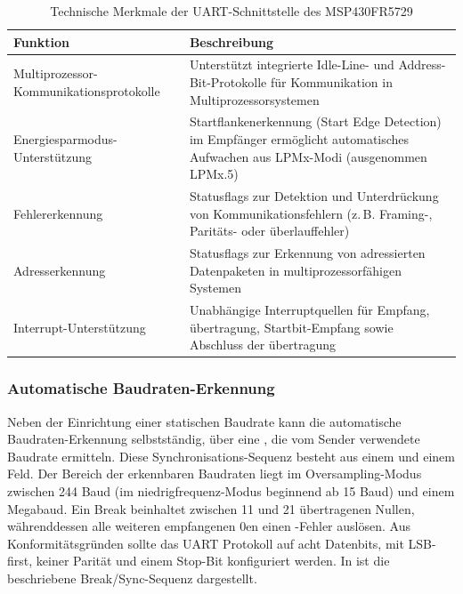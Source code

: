 \begin{table}[h!]
	\small
	\centering
	\begin{tabular}{|p{6.5cm}|p{7cm}|}
		\hline
		\textbf{Funktion} & \textbf{Beschreibung} \\
		\hline
		Multiprozessor-Kommunikationsprotokolle & Unterst\"utzt integrierte Idle-Line- und Address-Bit-Protokolle f\"ur Kommunikation in Multiprozessorsystemen \\
		\hline
		Energiesparmodus-Unterst\"utzung & Startflankenerkennung (Start Edge Detection) im Empf\"anger erm\"oglicht automatisches Aufwachen aus LPMx-Modi (ausgenommen LPMx.5) \\
		\hline
		Fehlererkennung & Statusflags zur Detektion und Unterdr\"uckung von Kommunikationsfehlern (z.\,B. Framing-, Parit\"ats- oder \"uberlauffehler) \\
		\hline
		Adresserkennung & Statusflags zur Erkennung von adressierten Datenpaketen in multiprozessorf\"ahigen Systemen \\
		\hline
		Interrupt-Unterst\"utzung & Unabh\"angige Interruptquellen f\"ur Empfang, \"ubertragung, Startbit-Empfang sowie Abschluss der \"ubertragung \\
		\hline
	\end{tabular}
	\caption{Technische Merkmale der UART-Schnittstelle des MSP430FR5729\\}
	\label{tab:uart_features}
\end{table}

\newpage
\subsubsection{Automatische Baudraten-Erkennung}
\label{auto_baud}

Neben der Einrichtung einer statischen Baudrate kann die automatische Baudraten-Erkennung selbstst\"andig, \"uber eine , die vom Sender verwendete Baudrate ermitteln. Diese Synchronisations-Sequenz besteht aus einem  und einem  Feld. Der Bereich der erkennbaren Baudraten liegt im Oversampling-Modus zwischen 244 Baud (im niedrigfrequenz-Modus beginnend ab 15 Baud) und einem Megabaud. Ein Break beinhaltet zwischen 11 und 21 \"ubertragenen Nullen, w\"ahrenddessen alle weiteren empfangenen 0en einen -Fehler ausl\"osen. Aus Konformit\"atsgr\"unden sollte das UART Protokoll auf acht Datenbits, mit LSB-first, keiner Parit\"at und einem Stop-Bit konfiguriert werden. In  ist die beschriebene Break/Sync-Sequenz dargestellt.

